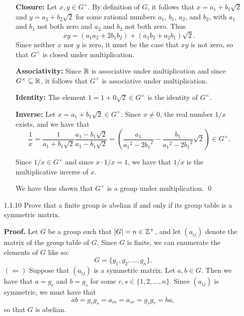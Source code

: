 \begin{enumerate}
\begin{enumerate}
               \textbf{Closure:} Let $x, y \in G^{\times}$. By definition of
               $G$, it follows that $x = a_1 + b_1\sqrt{2}$ and
               $y = a_2 + b_2\sqrt{2}$ for some rational numbers $a_1$, $b_1$,
               $a_2$, and $b_2$, with $a_1$ and $b_1$ not both zero and $a_2$
               and $b_2$ not both zero. Thus
               $$xy = (a_1a_2 + 2b_1b_2) + (a_1b_2 + a_2b_1)\sqrt{2}.$$
               Since neither $x$ nor $y$ is zero, it must be the case that $xy$
               is not zero, so that $G^{\times}$ is closed under multiplication.
               
               \textbf{Associativity:} Since $\mathbb{R}$ is associative under
               multiplication and since $G^{\times} \subseteq \mathbb{R}$, it follows
               that $G^{\times}$ is associative under multiplication.
               
               \textbf{Identity:} The element $1 = 1 + 0\sqrt{2} \in G^{\times}$
               is the identity of $G^{\times}$.
               
               \textbf{Inverse:} Let $x = a_1 + b_1\sqrt{2} \in G^{\times}$.
               Since $x \neq 0$, the real number $1/x$ exists, and we have that
               $$\frac{1}{x} = \frac{1}{a_1 + b_1\sqrt{2}}
                 \frac{a_1 - b_1\sqrt{2}}{a_1 - b_1\sqrt{2}} =
                 \left(\frac{a_1}{{a_1}^2 - 2{b_1}^2} -
                 \frac{b_1}{{a_1}^2 - 2{b_1}^2}\sqrt{2}\right) \in G^{\times}.
               $$
               
               Since $1/x \in G^{\times}$ and since $x \cdot 1/x = 1$, we have
               that $1/x$ is the multiplicative inverse of $x$.
               
               We have thus shown that $G^{\times}$ is a group under
               multiplication. \qed
      \end{enumerate}
   \item[1.1.10]  Prove that a finite group is abelian if and only if its group
                  table is a symmetric matrix.
                  
      \textbf{Proof.} Let $G$ be a group such that $|G| = n \in \mathbb{Z}^+$, and let
      $(a_{ij})$ denote the matrix of the group table of $G$. Since $G$ is
      finite, we can enumerate the elements of $G$ like so:
      $$G = \{g_1, g_2, \ldots, g_n\}.$$      
      $(\Leftarrow)$ Suppose that $(a_{ij})$ is a symmetric matrix. Let
      $a, b \in G$. Then we have that $a = g_r$ and $b = g_s$ for some
      $r, s \in \{1, 2, \ldots, n\}$. Since $(a_{ij})$ is symmetric, we must
      have that
      $$ab = g_rg_s = a_{rs} = a_{sr} = g_sg_r = ba,$$
      so that $G$ is abelian.
      

\end{enumerate}
